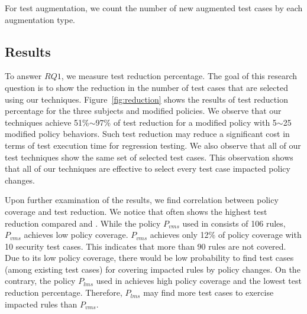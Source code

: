 For test augmentation,
we count the number of new augmented test cases by each augmentation type.

\subsection{Results}
To answer $RQ1$, 
we measure test reduction percentage.
The goal of this research question is to show the reduction in the number of test cases that
are selected using our techniques.
Figure~\ref{fig:reduction} shows the results of test reduction percentage for the three subjects and modified policies.
We observe that our techniques achieve 51\%$\sim$97\% of test reduction for a modified policy with 5$\sim$25 modified policy behaviors.
Such test reduction may reduce a significant cost in terms of test execution time
for regression testing. We also observe that all of our test techniques show the same
set of selected test cases. This observation shows that all of our techniques are
effective to select every test case impacted policy changes.

Upon further examination
of the results, we find correlation between policy coverage and test reduction.
We notice that  often shows the highest test reduction compared  and .
While the policy $P_{vms}$ used in  consists of 106 rules, $P_{vms}$ achieves low policy coverage.
$P_{vms}$ achieves only 12\% of policy coverage with 10 security test cases.
This indicates that more than 90 rules are not covered. Due to its low policy coverage, there would be low probability
to find test cases (among existing test cases) for covering impacted rules by policy changes.
On the contrary, the policy $P_{lms}$ used in  achieves high policy coverage and the lowest
test reduction percentage. Therefore, $P_{lms}$ may find more test
cases to exercise impacted rules than $P_{vms}$. 

 





